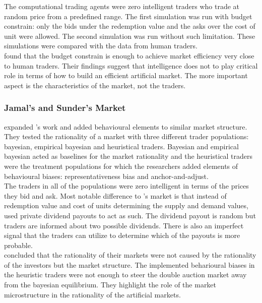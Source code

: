 The computational trading agents were zero intelligent traders 
who trade at random price from a predefined range. 
The first simulation was run with budget constrain: only the bids
under the redemption value and the asks over the cost of unit 
were allowed. The second simulation was run without such limitation.
These simulations were compared with the data from human traders. \\

\citeauthor{God93} found that the budget constrain is enough to 
achieve market efficiency very close to human traders. Their findings
suggest that intelligence does not to play critical role in terms of 
how to build an efficient artificial market. The more important aspect
is the characteristics of the market, not the traders. \\


\subsubsection{Jamal's and Sunder's Market}
\citet{Jam96} expanded \citeauthor{God93}'s work and added behavioural 
elements to similar market structure. They tested the rationality of
a market with three different trader populations: bayesian, empirical
bayesian and heuristical traders. Bayesian and empirical bayesian acted
as baselines for the market rationality and the heuristical traders were
the treatment populations for which the researchers added elements of behavioural
biases: representativeness bias and anchor-and-adjust. \\

The traders in all of the populations were zero intelligent in terms of the
prices they bid and ask. Most notable difference to \citet{God93}'s market
is that instead of redemption value and cost of units determining the
supply and demand values, \citeauthor{Jam96} used private dividend payouts 
to act as such. The dividend payout is random but traders are informed
about two possible dividends. There is also an imperfect signal that the
traders can utilize to determine which of the payouts is more probable. \\

\citeauthor{Jam96} concluded that the rationality of their markets were
not caused by the rationality of the investors but the market structure.
The implemented beharioural biases in the heuristic traders were not enough 
to steer the double auction market away from the bayesian equilibrium.
They highlight the role of the market microstructure in the rationality 
of the artificial markets. \\

